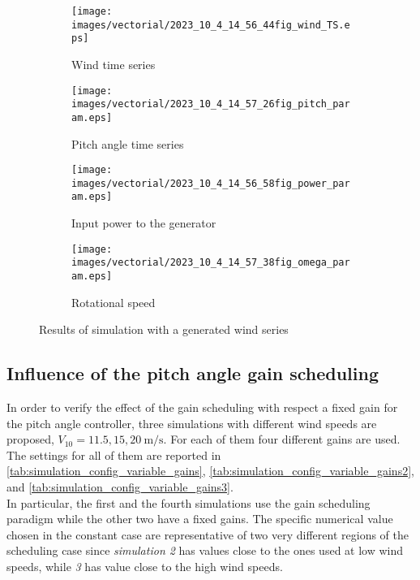 \begin{figure}[htb]
  \begin{subfigure}{0.49\columnwidth}
    \centering
    \texttt{[image: images/vectorial/2023\_10\_4\_14\_56\_44fig\_wind\_TS.eps]}
    \caption{Wind time series}
    \label{fig:2023_05_1_00_55_48fig_wind_TS.eps}
  \end{subfigure}
  \begin{subfigure}{0.49\columnwidth}
    \centering
    \texttt{[image: images/vectorial/2023\_10\_4\_14\_57\_26fig\_pitch\_param.eps]}
    \caption{Pitch angle time series}
    \label{fig:2023_05_1_00_50_19fig_power_param}
  \end{subfigure}
  \begin{subfigure}{0.49\columnwidth}
    \centering
    \texttt{[image: images/vectorial/2023\_10\_4\_14\_56\_58fig\_power\_param.eps]}
    \caption{Input power to the generator}
    \label{fig:2023_05_1_00_51_17fig_omega_param}
  \end{subfigure}
  \begin{subfigure}{0.49\columnwidth}
    \centering
    \texttt{[image: images/vectorial/2023\_10\_4\_14\_57\_38fig\_omega\_param.eps]}
    \caption{Rotational speed}
    \label{fig:2023_05_1_00_50_58fig_pitch_param}
  \end{subfigure}
  \caption{Results of simulation with a generated wind series}
  \label{fig:simulation_rand_wind_NPC}
\end{figure}

\subsection{Influence of the pitch angle gain scheduling}\label{subsec:gain_scheduling_disabling}
In order to verify the effect of the gain scheduling with respect a fixed gain for the pitch angle controller, three simulations with different wind speeds are proposed, $V_{10} = 11.5, 15, 20 \ \si{\meter\per\second}$. For each of them four different gains are used. The settings for all of them are reported in \autoref{tab:simulation_config_variable_gains}, \autoref{tab:simulation_config_variable_gains2}, and \autoref{tab:simulation_config_variable_gains3}. \\
In particular, the first and the fourth simulations use the gain scheduling paradigm while the other two have a fixed gains. The specific numerical value chosen in the constant case are representative of two very different regions of the scheduling case since \textit{simulation 2} has values close to the ones used at low wind speeds, while \textit{3} has value close to the high wind speeds. 

